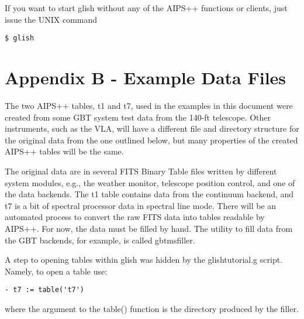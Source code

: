     If you want to start glish without any of the AIPS++ functions or
clients, just issue the UNIX command

\begin{verbatim}
$ glish
\end{verbatim}

\section{Appendix B - Example Data Files}

    The two AIPS++ tables, t1 and t7, used in the examples in this document
were created from some GBT system test data from the 140-ft telescope.
Other instruments, such as the VLA, will have a different file and
directory structure for the original data from the one outlined below, but
many properties of the created AIPS++ tables will be the same.

    The original data are in several FITS Binary Table files written by
different system modules, e.g., the weather monitor, telescope position
control, and one of the data backends.  The t1 table contains data from the
continuum backend, and t7 is a bit of spectral processor data in spectral
line mode.  There will be an automated process to convert the raw FITS data
into tables readable by AIPS++.  For now, the data must be filled by hand.
The utility to fill data from the GBT backends, for example, is called
gbtmsfiller.

    A step to opening tables within glish was hidden by the glishtutorial.g
script.  Namely, to open a table use:

\begin{verbatim}
- t7 := table('t7')
\end{verbatim}
where the argument to the table() function is the directory produced by the
filler.
